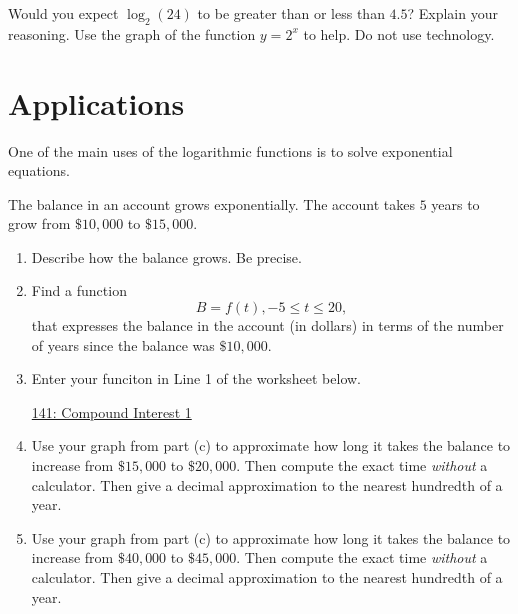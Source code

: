 \documentclass{ximera}
\begin{document}
\begin{question} \label{Q4:LogF}
Would you expect $\log_2(24)$ to be greater than or less than $4.5$? Explain your reasoning. Use the graph of the function $y=2^x$ to help. Do not use technology.
\end{question}



\section{Applications}

One of the main uses of the logarithmic functions is to solve exponential equations.


\begin{question}  \label{Q:dfehyyh5h}
The balance in an account grows exponentially. The account takes $5$ years to grow from $\$10,000$ to $\$15,000$. 

\begin{enumerate}
\item Describe how the balance grows. Be precise.

\item Find a function 
\[
B = f(t), -5\leq t \leq 20,
\]
that expresses the balance in the account (in dollars) in terms of the number of years since the balance was $\$10,000$.

\item Enter your funciton in Line 1 of the worksheet below. 

\begin{onlineOnly}
    \begin{center}
\end{center}
\end{onlineOnly}


\href{https://www.desmos.com/calculator/npf2ydovfl}{141: Compound Interest 1}

\item Use your graph from part (c) to approximate how long it takes the balance to increase from $\$15,000$ to $\$20,000$. Then compute the exact time \emph{without} a calculator. Then give a decimal approximation to the nearest hundredth of a year.

\item Use your graph from part (c) to approximate how long it takes the balance to increase from $\$40,000$ to $\$45,000$. Then compute the exact time \emph{without} a calculator. Then give a decimal approximation to the nearest hundredth of a year.

\end{enumerate}
\end{question}
\end{document}
